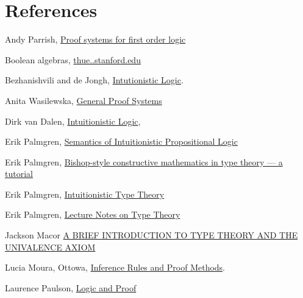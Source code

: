 \section{References}


\begin{thebibliography}




 Andy Parrish, \href{https://www.math.ucsd.edu/~sbuss/CourseWeb/Math260_2012WS/Feb10Parrish.pdf}{Proof systems for first order logic}

 Boolean algebras, \href{http://thue.stanford.edu/bool.html}{thue..stanford.edu}

 Bezhanishvili and de Jongh,  \href{https://www.illc.uva.nl/Research/Publications/Reports/PP-2006-25.text.pdf}{Intutionistic Logic}. 

 Anita Wasilewska, \href{https://www3.cs.stonybrook.edu/~cse541/chapter7.pdf}{General Proof Systems}

 Dirk van Dalen,  \href{https://pdfs.semanticscholar.org/1e75/6d625d4cf2d91f69149b3d5a1f2d07fe4b2f.pdf}{Intuitionistic Logic}, 

 Erik Palmgren, \href{http://www2.math.uu.se/~palmgren/tillog/heyting3.pdf}{Semantics of Intuitionistic Propositional Logic}

 Erik Palmgren, \href{http://staff.math.su.se/palmgren/Palmgren_Nis.pdf}{Bishop-style constructive mathematics in type theory — a tutorial}

 Erik Palmgren, \href{http://www.cse.chalmers.se/~peterd/papers/IntuitionisticTypeTheory150505.pdf}{Intuitionistic Type Theory}

 Erik Palmgren, \href{http://staff.math.su.se/palmgren/lecturenotesTT.pdf}{Lecture Notes on Type Theory}

 Jackson Macor \href{https://math.uchicago.edu/~may/REU2015/REUPapers/Macor.pdf}{A  BRIEF  INTRODUCTION  TO  TYPE  THEORY  AND  THE
UNIVALENCE  AXIOM}

 Lucia Moura, Ottowa, \href{https://www.site.uottawa.ca/~lucia/courses/2101-10/lecturenotes/04InferenceRulesProofMethods.pdf}{Inference Rules and Proof Methods}.  

 Laurence Paulson, \href{https://www.cl.cam.ac.uk/teaching/1112/LogicProof/logic-notes.pdf}{Logic and Proof}


\end{thebibliography}
